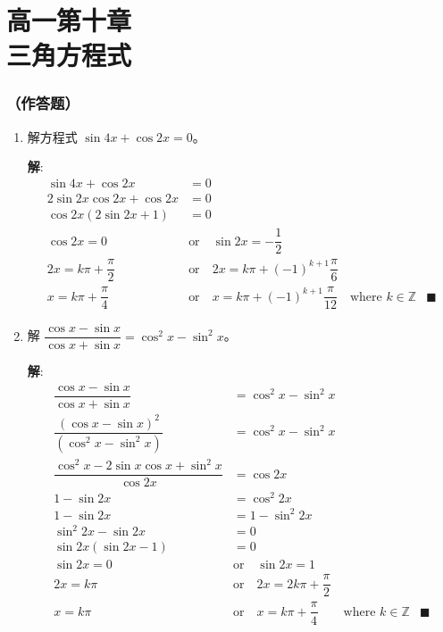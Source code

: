 \documentclass{report}
\newcommand{\sol}{\vspace{0.2cm}\textbf{解}:}
\begin{document}
\chapter*{\LARGE{高一第十章}\\\Huge{三角方程式}}

\setcounter{chapter}{9}
\setcounter{section}{0}

\allowdisplaybreaks
    \subsection*{（作答题）}

    \begin{enumerate}[leftmargin=*]
        \item 解方程式 $\sin 4 x+\cos 2 x=0$。
        
        \sol{}
        \begin{align*}
            \sin 4 x+\cos 2 x &= 0\\
            2\sin 2 x\cos 2 x + \cos 2 x &= 0\\
            \cos 2 x(2\sin 2 x + 1) &= 0\\
            \cos 2 x = 0 \quad &\text{or} \quad \sin 2 x = -\dfrac{1}{2}\\
            2x = k\pi + \dfrac{\pi}{2} \quad &\text{or} \quad 2x = k\pi + (-1)^{k+1} \dfrac{\pi}{6}\\
            x = k\pi + \dfrac{\pi}{4} \quad &\text{or} \quad x = k\pi + (-1)^{k+1} \dfrac{\pi}{12} \quad \text{where } k \in \mathbb{Z} & \blacksquare
        \end{align*}
        
        \item  解 $\dfrac{\cos x-\sin x}{\cos x+\sin x}=\cos ^2 x-\sin ^2 x$。
        
        \sol{}
        \begin{align*}
            \dfrac{\cos x-\sin x}{\cos x+\sin x} &= \cos^2 x - \sin^2 x\\
            \dfrac{(\cos x - \sin x)^2}{(\cos^2 x - \sin^2 x)} &= \cos^2 x - \sin^2 x\\
            \dfrac{\cos^2 x - 2\sin x\cos x + \sin^2 x}{\cos 2x} &= \cos 2x\\
            1 - \sin 2x &= \cos^2 2x\\
            1 - \sin 2x &= 1 - \sin^2 2x\\
            \sin^2 2x - \sin 2x &= 0\\
            \sin 2x(\sin 2x - 1) &= 0\\
            \sin 2x = 0 \quad &\text{or} \quad \sin 2x = 1\\
            2x = k\pi \quad &\text{or} \quad 2x = 2k\pi + \dfrac{\pi}{2}\\
            x = k\pi \quad &\text{or} \quad x = k\pi + \dfrac{\pi}{4} \qquad \text{where } k \in \mathbb{Z} & \blacksquare
        \end{align*}


\end{enumerate}
\end{document}
